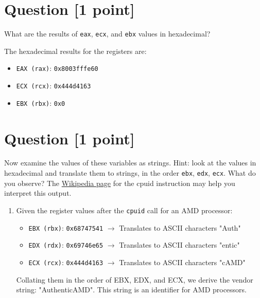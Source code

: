 \documentclass[11pt]{article}
\begin{document}
\section{Question [1 point]}

What are the results of \texttt{eax}, \texttt{ecx}, and \texttt{ebx} values in hexadecimal?

\begin{solution}
\item The hexadecimal results for the registers are:
    \begin{itemize}
        \item \texttt{EAX (rax)}: \texttt{0x8003fffe60}
        \item \texttt{ECX (rcx)}: \texttt{0x444d4163}
        \item \texttt{EBX (rbx)}: \texttt{0x0}
    \end{itemize}
\end{solution}


\section{Question [1 point]}

Now examine the values of these variables as strings. Hint: look at the values in hexadecimal and translate them to strings, in the order \texttt{ebx}, \texttt{edx}, \texttt{ecx}. What do you observe? The \href{https://en.wikipedia.org/wiki/CPUID}{Wikipedia page} for the cpuid instruction may help you interpret this output.

\begin{solution}
\begin{enumerate}
    \item Given the register values after the \texttt{cpuid} call for an AMD processor:
    \begin{itemize}
        \item \texttt{EBX (rbx)}: \texttt{0x68747541} $\rightarrow$ Translates to ASCII characters "Auth"
        \item \texttt{EDX (rdx)}: \texttt{0x69746e65} $\rightarrow$ Translates to ASCII characters "entic"
        \item \texttt{ECX (rcx)}: \texttt{0x444d4163} $\rightarrow$ Translates to ASCII characters "cAMD"
    \end{itemize}
    Collating them in the order of EBX, EDX, and ECX, we derive the vendor string: "AuthenticAMD". This string is an identifier for AMD processors.
\end{enumerate}
\end{solution}
\end{document}
